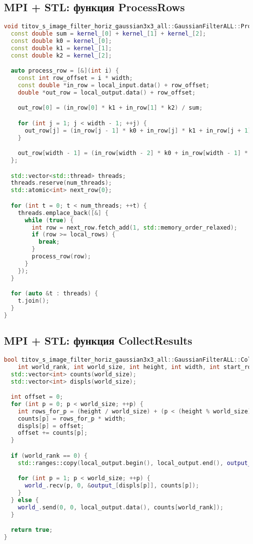 \documentclass[12pt]{article}
\begin{document}
\subsection*{MPI + STL: функция ProcessRows}
\begin{lstlisting}[language=C++]
void titov_s_image_filter_horiz_gaussian3x3_all::GaussianFilterALL::ProcessRows(const std::vector<double> &local_input, std::vector<double> &local_output, int width, int local_rows, int num_threads) {
  const double sum = kernel_[0] + kernel_[1] + kernel_[2];
  const double k0 = kernel_[0];
  const double k1 = kernel_[1];
  const double k2 = kernel_[2];

  auto process_row = [&](int i) {
    const int row_offset = i * width;
    const double *in_row = local_input.data() + row_offset;
    double *out_row = local_output.data() + row_offset;

    out_row[0] = (in_row[0] * k1 + in_row[1] * k2) / sum;

    for (int j = 1; j < width - 1; ++j) {
      out_row[j] = (in_row[j - 1] * k0 + in_row[j] * k1 + in_row[j + 1] * k2) / sum;
    }

    out_row[width - 1] = (in_row[width - 2] * k0 + in_row[width - 1] * k1) / sum;
  };

  std::vector<std::thread> threads;
  threads.reserve(num_threads);
  std::atomic<int> next_row{0};

  for (int t = 0; t < num_threads; ++t) {
    threads.emplace_back([&] {
      while (true) {
        int row = next_row.fetch_add(1, std::memory_order_relaxed);
        if (row >= local_rows) {
          break;
        }
        process_row(row);
      }
    });
  }

  for (auto &t : threads) {
    t.join();
  }
}
\end{lstlisting}

\subsection*{MPI + STL: функция CollectResults}
\begin{lstlisting}[language=C++]
bool titov_s_image_filter_horiz_gaussian3x3_all::GaussianFilterALL::CollectResults(
    int world_rank, int world_size, int height, int width, int start_row, const std::vector<double> &local_output) {
  std::vector<int> counts(world_size);
  std::vector<int> displs(world_size);

  int offset = 0;
  for (int p = 0; p < world_size; ++p) {
    int rows_for_p = (height / world_size) + (p < (height % world_size) ? 1 : 0);
    counts[p] = rows_for_p * width;
    displs[p] = offset;
    offset += counts[p];
  }

  if (world_rank == 0) {
    std::ranges::copy(local_output.begin(), local_output.end(), output_.begin() + displs[0]);

    for (int p = 1; p < world_size; ++p) {
      world_.recv(p, 0, &output_[displs[p]], counts[p]);
    }
  } else {
    world_.send(0, 0, local_output.data(), counts[world_rank]);
  }

  return true;
}
\end{lstlisting}
\end{document}
